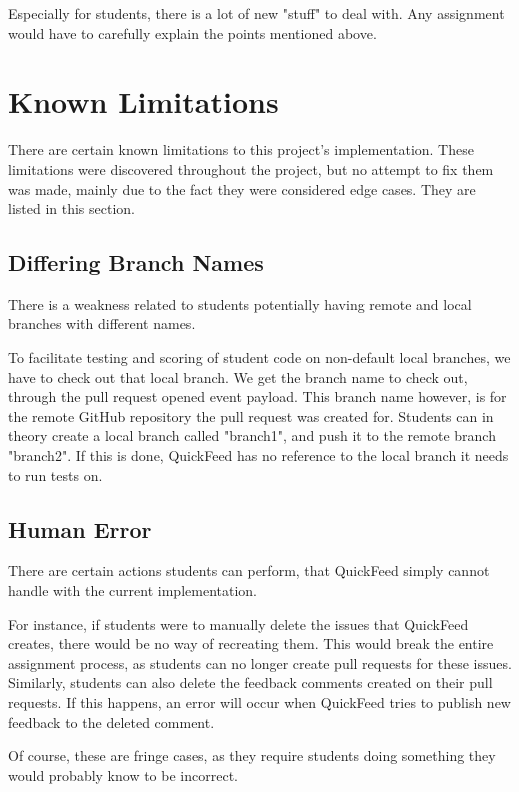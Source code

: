 Especially for students, there is a lot of new "stuff" to deal with.
Any assignment would have to carefully explain the points mentioned above.

\section{Known Limitations}

There are certain known limitations to this project's implementation.
These limitations were discovered throughout the project, but no attempt to fix them was made, mainly due to the fact they were considered edge cases.
They are listed in this section.

\subsection{Differing Branch Names}

There is a weakness related to students potentially having remote and local branches with different names.

To facilitate testing and scoring of student code on non-default local branches, we have to check out that local branch.
We get the branch name to check out, through the pull request opened event payload.
This branch name however, is for the remote GitHub repository the pull request was created for.
Students can in theory create a local branch called "branch1", and push it to the remote branch "branch2".
If this is done, QuickFeed has no reference to the local branch it needs to run tests on.

\subsection{Human Error}

There are certain actions students can perform, that QuickFeed simply cannot handle with the current implementation.

For instance, if students were to manually delete the issues that QuickFeed creates, there would be no way of recreating them.
This would break the entire assignment process, as students can no longer create pull requests for these issues.
Similarly, students can also delete the feedback comments created on their pull requests.
If this happens, an error will occur when QuickFeed tries to publish new feedback to the deleted comment.

Of course, these are fringe cases, as they require students doing something they would probably know to be incorrect.

